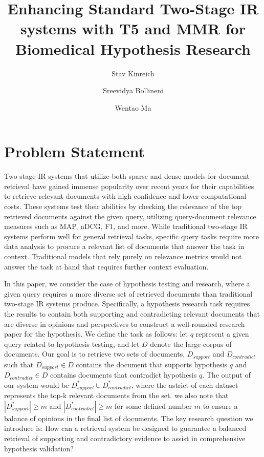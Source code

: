 \documentclass[sigconf]{acmart}
\begin{document}
\title{Enhancing Standard Two-Stage IR systems with T5 and MMR for Biomedical Hypothesis Research}

\author{Stav Kinreich}

\author{Sreevidya Bollineni}

\author{Wentao Ma}

\maketitle

\section{Problem Statement}
  Two-stage IR systems that utilize both sparse and dense models for document retrieval have gained immense popularity over recent years for their capabilities to retrieve relevant documents with high confidence and lower computational costs. These systems test their abilities by checking the relevance of the top retrieved documents against the given query, utilizing query-document relevance measures such as MAP, nDCG, F1, and more. While traditional two-stage IR systems perform well for general retrieval tasks, specific query tasks require more data analysis to procure a relevant list of documents that answer the task in context. Traditional models that rely purely on relevance metrics would not answer the task at hand that requires further context evaluation.
  
  In this paper, we consider the case of hypothesis testing and research, where a given query requires a more diverse set of retrieved documents than traditional two-stage IR systems produce. Specifically, a hypothesis research task requires the results to contain both supporting and contradicting relevant documents that are diverse in opinions and perspectives to construct a well-rounded research paper for the hypothesis. We define the task as follows: let $q$ represent a given query related to hypothesis testing, and let $D$ denote the large corpus of documents. Our goal is to retrieve two sets of documents, $D_{support}$ and $D_{contradict}$ such that $D_{support}\in D$ contains the document that supports hypothesis $q$ and $D_{contradict}\in D$ contains documents that contradict hypothesis $q$. The output of our system would be $D_{support}^*\cup D_{contradict}^*$, where the astrict of each dataset represents the top-k relevant documents from the set. we also note that $|D_{support}^*|\geq m$ and $|D_{contradict}^*|\geq m$ for some defined number $m$ to ensure a balance of opinions in the final list of documents. The key research question we introduce is: How can a retrieval system be designed to guarantee a balanced retrieval of supporting and contradictory evidence to assist in comprehensive hypothesis validation?
\end{document}
